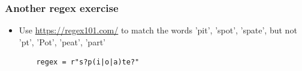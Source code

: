 \documentclass[xcolor=table]{beamer}
\begin{document}
\begin{frame}[fragile]
    \frametitle{Another regex exercise}
    \begin{itemize}
        \item Use \url{https://regex101.com/} to match the words 'pit', 'spot', 'spate', but not 'pt', 'Pot', 'peat', 'part'
\begin{lstlisting} 
    regex = r"s?p(i|o|a)te?"
\end{lstlisting} 
    \end{itemize}
\end{frame}

\end{document}
